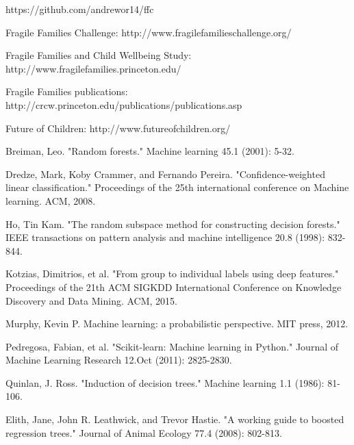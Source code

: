 \documentclass{article} %
\begin{document}

\begin{thebibliography}{}

https://github.com/andrewor14/ffc

Fragile Families Challenge: http://www.fragilefamilieschallenge.org/

Fragile Families and Child Wellbeing Study: http://www.fragilefamilies.princeton.edu/

Fragile Families publications: http://crcw.princeton.edu/publications/publications.asp

Future of Children: http://www.futureofchildren.org/

Breiman, Leo. "Random forests." Machine learning 45.1 (2001): 5-32.

Dredze, Mark, Koby Crammer, and Fernando Pereira. "Confidence-weighted linear classification." Proceedings of the 25th international conference on Machine learning. ACM, 2008.

Ho, Tin Kam. "The random subspace method for constructing decision forests." IEEE transactions on pattern analysis and machine intelligence 20.8 (1998): 832-844.

Kotzias, Dimitrios, et al. "From group to individual labels using deep features." Proceedings of the 21th ACM SIGKDD International Conference on Knowledge Discovery and Data Mining. ACM, 2015.

Murphy, Kevin P. Machine learning: a probabilistic perspective. MIT press, 2012.

Pedregosa, Fabian, et al. "Scikit-learn: Machine learning in Python." Journal of Machine Learning Research 12.Oct (2011): 2825-2830.

Quinlan, J. Ross. "Induction of decision trees." Machine learning 1.1 (1986): 81-106.

Elith, Jane, John R. Leathwick, and Trevor Hastie. "A working guide to boosted regression trees." Journal of Animal Ecology 77.4 (2008): 802-813.
 
\end{thebibliography}
\end{document}
